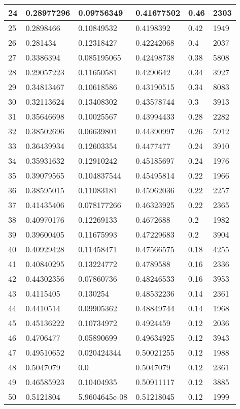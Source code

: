 \begin{longtable}{|l|l|l|l|l|l|}
24 & 0.28977296 & 0.09756349 & 0.41677502 & 0.46 & 2303 \\ \hline 
25 & 0.2898466 & 0.10849532 & 0.4198392 & 0.42 & 1949 \\ \hline 
26 & 0.281434 & 0.12318427 & 0.42242068 & 0.4 & 2037 \\ \hline 
27 & 0.3386394 & 0.085195065 & 0.42498738 & 0.38 & 5808 \\ \hline 
28 & 0.29057223 & 0.11650581 & 0.4290642 & 0.34 & 3927 \\ \hline 
29 & 0.34813467 & 0.10618586 & 0.43190515 & 0.34 & 8083 \\ \hline 
30 & 0.32113624 & 0.13408302 & 0.43578744 & 0.3 & 3913 \\ \hline 
31 & 0.35646698 & 0.10025567 & 0.43994433 & 0.28 & 2282 \\ \hline 
32 & 0.38502696 & 0.06639801 & 0.44390997 & 0.26 & 5912 \\ \hline 
33 & 0.36439934 & 0.12603354 & 0.4477477 & 0.24 & 3910 \\ \hline 
34 & 0.35931632 & 0.12910242 & 0.45185697 & 0.24 & 1976 \\ \hline 
35 & 0.39079565 & 0.104837544 & 0.45495814 & 0.22 & 1966 \\ \hline 
36 & 0.38595015 & 0.11083181 & 0.45962036 & 0.22 & 2257 \\ \hline 
37 & 0.41435406 & 0.078177266 & 0.46323925 & 0.22 & 2365 \\ \hline 
38 & 0.40970176 & 0.12269133 & 0.4672688 & 0.2 & 1982 \\ \hline 
39 & 0.39600405 & 0.11675993 & 0.47229683 & 0.2 & 3904 \\ \hline 
40 & 0.40929428 & 0.11458471 & 0.47566575 & 0.18 & 4255 \\ \hline 
41 & 0.40840295 & 0.13224772 & 0.4789588 & 0.16 & 2336 \\ \hline 
42 & 0.44302356 & 0.07860736 & 0.48246533 & 0.16 & 3953 \\ \hline 
43 & 0.4115405 & 0.130254 & 0.48532236 & 0.14 & 2361 \\ \hline 
44 & 0.4410514 & 0.09905362 & 0.48849744 & 0.14 & 1968 \\ \hline 
45 & 0.45136222 & 0.10734972 & 0.4924459 & 0.12 & 2036 \\ \hline 
46 & 0.4706477 & 0.05890699 & 0.49634925 & 0.12 & 3943 \\ \hline 
47 & 0.49510652 & 0.020424344 & 0.50021255 & 0.12 & 1988 \\ \hline 
48 & 0.5047079 & 0.0 & 0.5047079 & 0.12 & 2361 \\ \hline 
49 & 0.46585923 & 0.10404935 & 0.50911117 & 0.12 & 3885 \\ \hline 
50 & 0.5121804 & 5.9604645e-08 & 0.51218045 & 0.12 & 1999 \\ \hline 
\end{longtable}